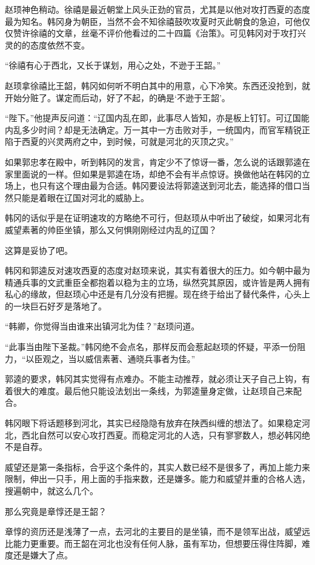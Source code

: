 赵顼神色稍动。徐禧是最近朝堂上风头正劲的官员，尤其是以他对攻打西夏的态度最为知名。韩冈身为朝臣，当然不会不知徐禧鼓吹攻夏时灭此朝食的急迫，可他仅仅赞许徐禧的文章，丝毫不评价他看过的二十四篇《治策》。可见韩冈对于攻打兴灵的的态度依然不变。

“徐禧有心于西北，又长于谋划，用心之处，不逊于王韶。”

赵顼拿徐禧比王韶，韩冈如何听不明白其中的用意，心下冷笑。东西还没抢到，就开始分赃了。谋定而后动，好了不起，的确是‘不逊于王韶’。

“陛下。”他提声反问道：“辽国内乱在即，此事尽人皆知，亦是板上钉钉。可辽国能内乱多少时间？却是无法确定。万一其中一方击败对手，一统国内，而官军精锐正陷于西夏的兴灵两府之中，到时候，可就是河北的灭顶之灾。”

如果郭忠孝在殿中，听到韩冈的发言，肯定少不了惊讶一番，怎么说的话跟郭逵在家里面说的一样。但如果是郭逵在场，却绝不会有半点惊讶。换做他站在韩冈的立场上，也只有这个理由最为合适。韩冈要设法将郭逵送到河北去，能选择的借口当然只能是着眼在辽国对河北的威胁上。

韩冈的话似乎是在证明速攻的方略绝不可行，但赵顼从中听出了破绽，如果河北有威望素著的帅臣坐镇，那么又何惧刚刚经过内乱的辽国？

这算是妥协了吧。

韩冈和郭逵反对速攻西夏的态度对赵顼来说，其实有着很大的压力。如今朝中最为精通兵事的文武重臣全都抱着以稳为主的立场，纵然究其原因，或许皆是两人拥有私心的缘故，但赵顼心中还是有几分没有把握。现在终于给出了替代条件，心头上的一块巨石好歹是落地了。

“韩卿，你觉得当由谁来出镇河北为佳？”赵顼问道。

“此事当由陛下圣裁。”韩冈绝不会点名，那样反而会惹起赵顼的怀疑，平添一份阻力，“以臣观之，当以威信素著、通晓兵事者为佳。”

郭逵的要求，韩冈其实觉得有点难办。不能主动推荐，就必须让天子自己上钩，有着很大的难度。最后他只能设法划出一条线，为郭逵量身定做，让赵顼自己来配合。

韩冈眼下将话题移到河北，其实已经隐隐有放弃在陕西纠缠的想法了。如果稳定河北，西北自然可以安心攻打西夏。而稳定河北的人选，只有寥寥数人，想必韩冈绝不是自荐。

威望还是第一条指标，合乎这个条件的，其实人数已经不是很多了，再加上能力来限制，伸出一只手，用上面的手指来数，还是嫌多。能力和威望并重的合格人选，搜遍朝中，就这么几个。

那么究竟是章惇还是王韶？

章惇的资历还是浅薄了一点，去河北的主要目的是坐镇，而不是领军出战，威望远比能力更重要。而王韶在河北也没有任何人脉，虽有军功，但想要压得住阵脚，难度还是嫌大了点。

